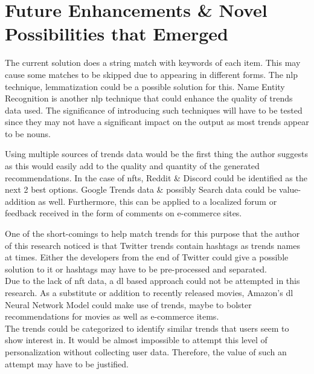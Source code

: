 \documentclass[manuscript,natbib=false]{acmart}
\begin{document}
\section{Future Enhancements \& Novel Possibilities that Emerged}

The current solution does a string match with keywords of each item. This may cause some matches to be skipped due to appearing in different forms. The \gls{nlp} technique, lemmatization could be a possible solution for this. Name Entity Recognition is another \gls{nlp} technique that could enhance the quality of trends data used. The significance of introducing such techniques will have to be tested since they may not have a significant impact on the output as most trends appear to be nouns.

Using multiple sources of trends data would be the first thing the author suggests as this would easily add to the quality and quantity of the generated recommendations. In the case of \gls{nft}s, Reddit \& Discord could be identified as the next 2 best options. Google Trends data \& possibly Search data could be value-addition as well. Furthermore, this can be applied to a localized forum or feedback received in the form of comments on e-commerce sites.

One of the short-comings to help match trends for this purpose that the author of this research noticed is that Twitter trends contain hashtags as trends names at times. Either the developers from the end of Twitter could give a possible solution to it or hashtags may have to be pre-processed and separated.\\


Due to the lack of \gls{nft} data, a \gls{dl} based approach could not be attempted in this research. As a substitute or addition to recently released movies, Amazon's \gls{dl} Neural Network Model could make use of trends, maybe to bolster recommendations for movies as well as e-commerce items.\\


The trends could be categorized to identify similar trends that users seem to show interest in. It would be almost impossible to attempt this level of personalization without collecting user data. Therefore, the value of such an attempt may have to be justified.\\
\end{document}
